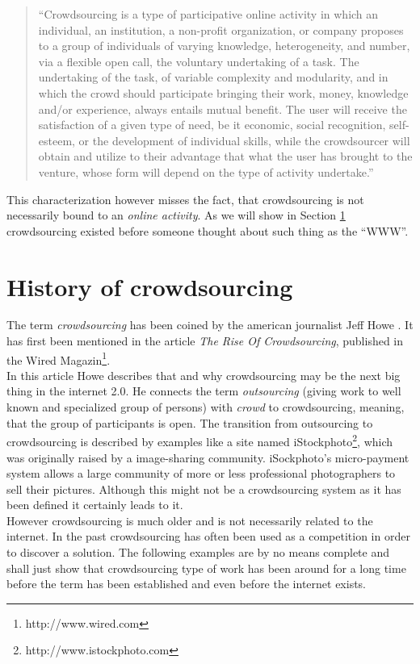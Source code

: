 \documentclass{acm_proc_article-sp}
\begin{document}
\begin{quote}
``Crowdsourcing is a type of participative online activity in which an individual, an institution, a non-profit organization, or company proposes to a group of individuals of varying knowledge, heterogeneity, and number, via a flexible open call, the voluntary undertaking of a task.  The undertaking of the task, of variable complexity and modularity, and in which the crowd should participate bringing their work, money, knowledge and/or experience, always entails mutual benefit. The user will receive the satisfaction of a given type of need, be it economic, social recognition, self-esteem, or the development of individual skills, while the crowdsourcer will obtain and utilize to their advantage that what the user has brought to the venture, whose form will depend on the type of activity undertake.''
\end{quote}
This characterization however misses the fact, that crowdsourcing is not necessarily bound to an \textit{online activity}. As we will show in Section \ref{sect:history} crowdsourcing existed before someone thought about such thing as the ``WWW''.

\section{History of crowdsourcing}
\label{sect:history}
The term \textit{crowdsourcing} has been coined by the american journalist Jeff Howe \cite{howe:rise}. It has first been mentioned in the article \textit{The Rise Of Crowdsourcing}, published in the Wired Magazin\footnote{http://www.wired.com}. \\
In this article Howe describes that and why crowdsourcing may be the next big thing in the internet 2.0. He connects the term \textit{outsourcing} (giving work to well known and specialized group of persons) with \textit{crowd} to crowdsourcing, meaning, that the group of participants is open. The transition from outsourcing to crowdsourcing is described by examples like a site named iStockphoto\footnote{http://www.istockphoto.com}, which was originally raised by a image-sharing community. iSockphoto's micro-payment system allows a large community of more or less professional photographers to sell their pictures. Although this might not be a crowdsourcing system as it has been defined it certainly leads to it.\\
However crowdsourcing is much older and is not necessarily related to the internet. In the past crowdsourcing has often been used as a competition in order to discover a solution. The following examples are by no means complete and shall just show that crowdsourcing type of work has been around for a long time before the term has been established and even before the internet exists.
\end{document}
